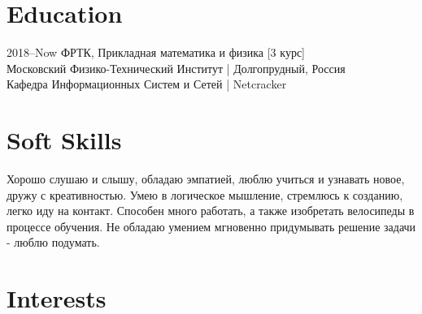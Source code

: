 \documentclass[]{cv-style}          %
\begin{document}

\section{Education}

\begin{entrylist}
\entry
{2018--Now}
{{\normalfont ФРТК, Прикладная математика и физика [3 курс]}}
{\\Московский Физико-Технический Институт  |  Долгопрудный, Россия \\Кафедра Информационных Систем и Сетей | Netcracker}
{\vspace{-0.3cm}}
\end{entrylist}


\section{Soft Skills}
  \vspace{-0.4cm}
Хорошо слушаю и слышу, обладаю эмпатией, люблю учиться и узнавать новое, дружу с креативностью. Умею в логическое мышление, стремлюсь к созданию, легко иду на контакт. Способен много работать, а также изобретать велосипеды в процессе обучения. Не обладаю умением мгновенно придумывать решение задачи - люблю подумать.


\section{Interests}
\end{document}
